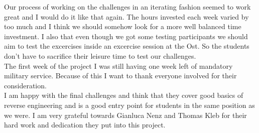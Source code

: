 Our process of working on the challenges in an iterating fashion seemed to work great and I would do it like that again. The hours invested each week varied by too much and I think we should somehow look for a more well balanced time investment. I also that even though we got some testing participants we should aim to test the excercises inside an excercise session at the Ost. So the students don't have to sacrifice their leisure time to test our challenges.\\
The first week of the project I was still having one week left of mandatory military service. Because of this I want to thank everyone involved for their consideration. \\
I am happy with the final challenges and think that they cover good basics of reverse engineering and is a good entry point for students in the same position as we were. I am very grateful towards Gianluca Nenz and Thomas Kleb for their hard work and dedication they put into this project. 
